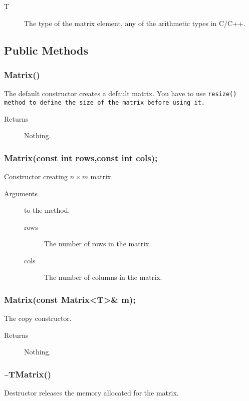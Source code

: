 \begin{description}
  \item[T] The type of the matrix element, any of the 
   arithmetic types in C/C++.
\end{description}

\subsection{Public Methods}

\subsubsection{Matrix()}
The default constructor creates a default matrix. You have to use 
\tt resize() \rm method to define the size of the matrix 
before using it. 
\begin{description}
  \item[Returns] Nothing.
\end{description}

\subsubsection{Matrix(const int rows,const int cols);}
Constructor creating $n \times m$ matrix.
\begin{description}
  \item[Arguments] to the method.
    \begin{description}
      \item[rows] The number of rows in the matrix.
      \item[cols] The number of columns in the matrix.
    \end{description}
\end{description}

\subsubsection{Matrix(const Matrix<T>\& m);}
The copy constructor.

\begin{description}
  \item[Returns] Nothing.
\end{description}

\subsubsection{\~{ }TMatrix()}
Destructor releases the memory allocated for the matrix.

